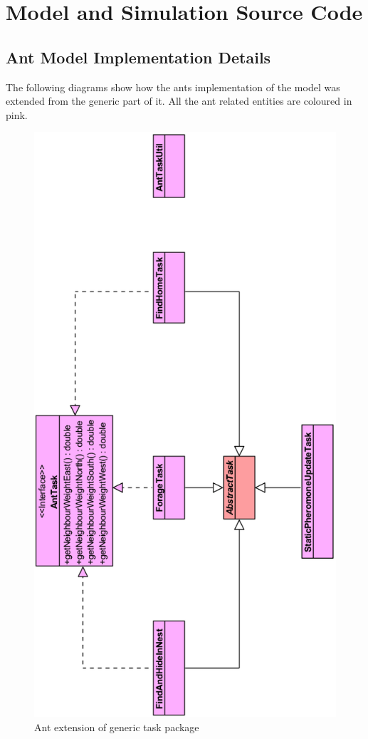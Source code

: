 \chapter{Model and Simulation Source Code}
\label{chapter:model-code}

\section{Ant Model Implementation Details}

The following diagrams show how the ants implementation of the model was extended from the generic part of it. All the ant related entities are coloured in pink.

\begin{figure}[H]
  \centering
  \includegraphics[width=0.55\linewidth]{gfx/ant-task.png}
  \caption{Ant extension of generic task package}
  \label{fig:ant-task}
\end{figure}

